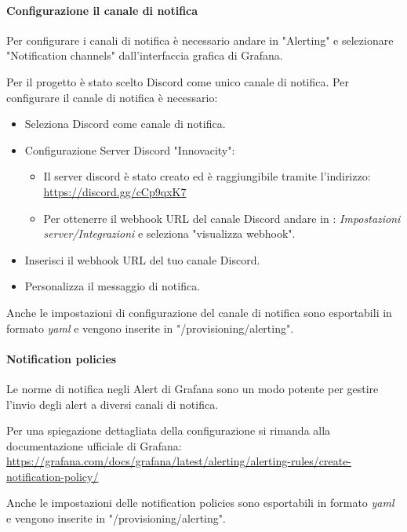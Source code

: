 \paragraph{Configurazione il canale di notifica}
Per configurare i canali di notifica è necessario andare in "Alerting" e selezionare "Notification channels" dall'interfaccia grafica di Grafana.

Per il progetto è stato scelto Discord come unico canale di notifica.
Per configurare il canale di notifica è necessario:
\begin{itemize}
    \item Seleziona Discord come canale di notifica.
    \item Configurazione Server Discord "Innovacity":
    \begin{itemize}
        \item Il server discord è stato creato ed è raggiungibile tramite l'indirizzo: \href{https://discord.gg/cCp9qxK7}{https://discord.gg/cCp9qxK7}
        \item Per ottenerre il webhook URL del canale Discord andare in : \textit{Impostazioni server/Integrazioni} e seleziona "visualizza webhook".
    \end{itemize}
    \item Inserisci il webhook URL del tuo canale Discord.
    \item Personalizza il messaggio di notifica.
    
\end{itemize}

Anche le impostazioni di configurazione del canale di notifica sono esportabili in formato \textit{yaml} e vengono inserite in "/provisioning/alerting".



\paragraph{Notification policies}
Le norme di notifica negli Alert di Grafana sono un modo potente per gestire l'invio degli alert a diversi canali di notifica.

Per una spiegazione dettagliata della configurazione si rimanda alla documentazione ufficiale di Grafana: \href{https://grafana.com/docs/grafana/latest/alerting/alerting-rules/create-notification-policy/}{https://grafana.com/docs/grafana/latest/alerting/alerting-rules/create-notification-policy/}

Anche le impostazioni delle notification policies sono esportabili in formato \textit{yaml} e vengono inserite in "/provisioning/alerting".

